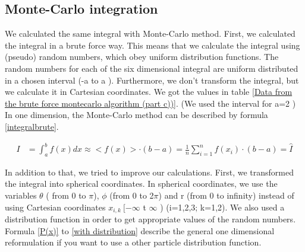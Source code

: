 \documentclass[10pt,a4paper]{article}
\begin{document}
\subsection{Monte-Carlo integration}

We calculated the same integral with Monte-Carlo method. First, we calculated the integral in a brute force way. This means that we calculate the integral using (pseudo) random numbers, which obey uniform distribution functions. The random numbers for each of the six dimensional integral are uniform distributed in a chosen interval (-a to a ). Furthermore, we don't transform the integral, but we calculate it in Cartesian coordinates. We got the values in table \ref{Data from the brute force montecarlo algorithm (part c))}. (We used the interval for a=2 ) In one dimension, the Monte-Carlo method can be described by formula \ref{integralbrute}. 

\begin{align}
I &= \int_{a}^{b} f(x) dx \approx < f(x) > \cdot (b-a) = \frac{1}{n} \sum_{i=1}^{n} f(x_i) \cdot (b-a) = \hat{I} \label{integralbrute}
\end{align}
 
In addition to that, we tried to improve our calculations. First, we transformed the integral into spherical coordinates. In spherical coordinates, we use the variables $\theta$ ( from 0 to $\pi$), $\phi$ (from 0 to 2$\pi$) and r (from 0 to infinity) instead of using Cartesian coordinates $x_{i,k} \ [-\infty$ t $\infty$ ) (i=1,2,3; k=1,2). We also used a distribution function in order to get appropriate values of the random numbers.  Formula \ref{P(x)} to \ref{with distribution} describe the general one dimensional reformulation if you want to use a other particle distribution function. 
\end{document}
